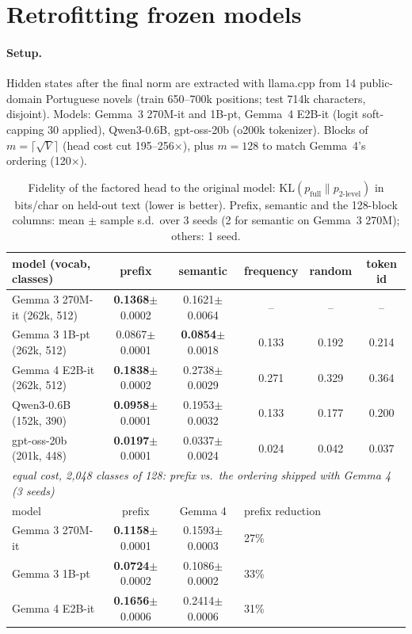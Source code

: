\documentclass[11pt]{article}
\begin{document}
\section{Retrofitting frozen models}\label{sec:retrofit}

\paragraph{Setup.} Hidden states after the final norm are extracted with llama.cpp from 14 public-domain Portuguese novels (train 650--700k positions; test 714k characters, disjoint). Models: Gemma~3 270M-it and 1B-pt, Gemma~4 E2B-it (logit soft-capping 30 applied), Qwen3-0.6B, gpt-oss-20b (o200k tokenizer). Blocks of $m=\lceil\sqrt V\rceil$ (head cost cut 195--256$\times$), plus $m=128$ to match Gemma~4's ordering (120$\times$).

\begin{table}[t]
\centering
\caption{Fidelity of the factored head to the original model: $\mathrm{KL}(p_{\text{full}}\|p_{\text{2-level}})$ in bits/char on held-out text (lower is better). Prefix, semantic and the 128-block columns: mean $\pm$ sample s.d.\ over 3 seeds (2 for semantic on Gemma~3 270M); others: 1 seed.}
\label{tab:kl}
\small
\begin{tabular}{lccccc}
\toprule
model (vocab, classes) & prefix & semantic & frequency & random & token id \\
\midrule
Gemma 3 270M-it (262k, 512) & \textbf{0.1368}$\pm$0.0002 & 0.1621$\pm$0.0064 & -- & -- & -- \\
Gemma 3 1B-pt (262k, 512) & 0.0867$\pm$0.0001 & \textbf{0.0854}$\pm$0.0018 & 0.133 & 0.192 & 0.214 \\
Gemma 4 E2B-it (262k, 512) & \textbf{0.1838}$\pm$0.0002 & 0.2738$\pm$0.0029 & 0.271 & 0.329 & 0.364 \\
Qwen3-0.6B (152k, 390) & \textbf{0.0958}$\pm$0.0001 & 0.1953$\pm$0.0032 & 0.133 & 0.177 & 0.200 \\
gpt-oss-20b (201k, 448) & \textbf{0.0197}$\pm$0.0001 & 0.0337$\pm$0.0024 & 0.024 & 0.042 & 0.037 \\
\midrule
\multicolumn{6}{l}{\emph{equal cost, 2{,}048 classes of 128: prefix vs.\ the ordering shipped with Gemma 4 (3 seeds)}} \\
model & prefix & Gemma 4 & \multicolumn{3}{l}{prefix reduction} \\
Gemma 3 270M-it & \textbf{0.1158}$\pm$0.0001 & 0.1593$\pm$0.0003 & \multicolumn{3}{l}{27\%} \\
Gemma 3 1B-pt & \textbf{0.0724}$\pm$0.0002 & 0.1086$\pm$0.0002 & \multicolumn{3}{l}{33\%} \\
Gemma 4 E2B-it & \textbf{0.1656}$\pm$0.0006 & 0.2414$\pm$0.0006 & \multicolumn{3}{l}{31\%} \\
\bottomrule
\end{tabular}
\end{table}
\end{document}
